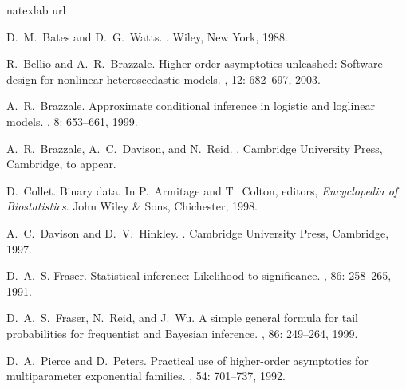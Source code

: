\documentclass[a4paper,11pt]{article}
\begin{document}
\begin{thebibliography}{10}
\expandafter\ifx\csname natexlab\endcsname\relax\def\natexlab#1{#1}\fi
\expandafter\ifx\csname url\endcsname\relax
  \def\url#1{{\tt #1}}\fi

D.~M.~Bates and D.~G.~Watts.
.
\newblock Wiley, New York, 1988.

R.~Bellio and A.~R.~Brazzale.
\newblock Higher-order asymptotics unleashed: Software design for nonlinear heteroscedastic models.
, 12: 682--697, 2003.

A.~R.~Brazzale.
\newblock Approximate conditional inference in logistic and loglinear models.
, 8: 653--661, 1999.

A.~R.~Brazzale, A.~C.~Davison, and N.~Reid.
.
\newblock Cambridge University Press, Cambridge, to appear.

D.~Collet.
\newblock Binary data.
\newblock In P.~Armitage and T.~Colton, editors, {\em Encyclopedia of
  Biostatistics}. John Wiley \& Sons, Chichester, 1998.

A.~C.~Davison and D.~V.~Hinkley.
.
\newblock Cambridge University Press, Cambridge, 1997.

D.~A.~S. Fraser.
\newblock Statistical inference: Likelihood to significance.
, 86:
  258--265, 1991.

D.~A.~S.~Fraser, N.~Reid, and J.~Wu.
\newblock A simple general formula for tail probabilities for frequentist and
  Bayesian inference.
, 86: 249--264, 1999.

D.~A.~Pierce and D.~Peters.
\newblock Practical use of higher-order asymptotics for multiparameter
  exponential families.
, 54:
  701--737, 1992.


\end{thebibliography}
\end{document}

